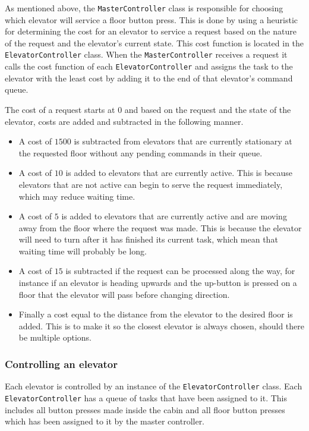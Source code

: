 \documentclass[a4paper]{article}
\begin{document}
As mentioned above, the \texttt{MasterController} class is responsible for
choosing which elevator will service a floor button press. This is done by using
a heuristic for determining the cost for an elevator to service a request based
on the nature of the request and the elevator's current state. This cost
function is located in the \texttt{ElevatorController} class. When the
\texttt{MasterController} receives a request it calls the cost function of each
\texttt{ElevatorController} and assigns the task to the elevator with the least
cost by adding it to the end of that elevator's command queue.

The cost of a request starts at $0$ and based on the request and the state of
the elevator, costs are added and subtracted in the following manner.

\begin{itemize}
\item A cost of $1500$ is subtracted from elevators that are currently stationary
    at the requested floor without any pending commands in their queue.
\item A cost of $10$ is added to elevators that are currently active. This is
    because elevators that are not active can begin to serve the request
    immediately, which may reduce waiting time.
\item A cost of $5$ is added to elevators that are currently active and are
    moving away from the floor where the request was made. This is because the
    elevator will need to turn after it has finished its current task, which
    mean that waiting time will probably be long.
\item A cost of $15$ is subtracted if the request can be processed along the
    way, for instance if an elevator is heading upwards and the up-button is
    pressed on a floor that the elevator will pass before changing direction.
\item Finally a cost equal to the distance from the elevator to the desired
    floor is added. This is to make it so the closest elevator is always chosen,
    should there be multiple options.
\end{itemize}

\subsubsection{Controlling an elevator}

Each elevator is controlled by an instance of the \texttt{ElevatorController}
class. Each \texttt{ElevatorController} has a queue of tasks that have been
assigned to it. This includes all button presses made inside the cabin and all
floor button presses which has been assigned to it by the master controller.
\end{document}

